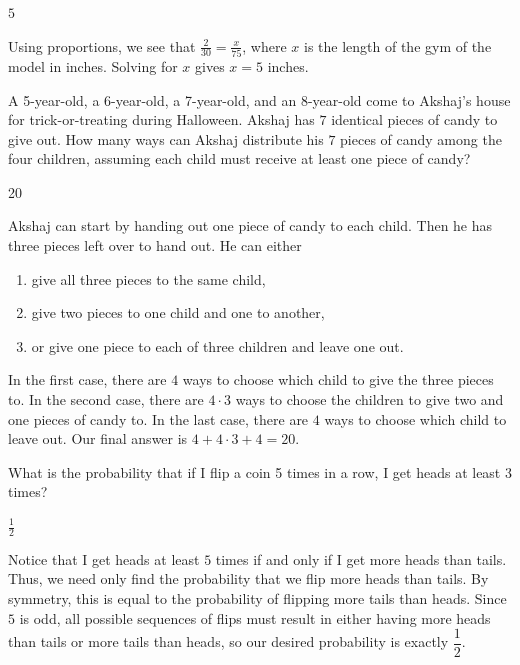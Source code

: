 \documentclass[11pt]{article}
\begin{document}
\begin{answer}
$5$
\end{answer}

\begin{solution}
Using proportions, we see that $\frac{2}{30} = \frac{x}{75}$, where $x$ is the length of the gym of the model in inches. Solving for $x$ gives $x=\boxed{5}$ inches.
\end{solution}


\begin{problem}
A 5-year-old, a 6-year-old, a 7-year-old, and an 8-year-old come to Akshaj's house for trick-or-treating during Halloween. Akshaj has $7$ identical pieces of candy to give out. How many ways can Akshaj distribute his $7$ pieces of candy among the four children, assuming each child must receive at least one piece of candy?
\end{problem}

\begin{answer}
20
\end{answer}

\begin{solution}
Akshaj can start by handing out one piece of candy to each child. Then he has three pieces left over to hand out. He can either \begin{enumerate} \item give all three pieces to the same child, \item give two pieces to one child and one to another, \item or give one piece to each of three children and leave one out. \end{enumerate}
In the first case, there are $4$ ways to choose which child to give the three pieces to. In the second case, there are $4 \cdot 3$ ways to choose the children to give two and one pieces of candy to. In the last case, there are $4$ ways to choose which child to leave out. Our final answer is $4 + 4 \cdot 3 + 4 = \boxed{20}$.
\end{solution}


\begin{problem}
What is the probability that if I flip a coin 5 times in a row, I get heads at least 3 times?
\end{problem}

\begin{answer}
$\frac{1}{2}$
\end{answer}

\begin{solution}
Notice that I get heads at least $5$ times if and only if I get more heads than tails. 
Thus, we need only find the probability that we flip more heads than tails. By symmetry, this is equal to the probability of flipping more 
tails than heads. Since $5$ is odd, all possible sequences of flips must result in either having more heads than tails or more 
tails than heads, so our desired probability is exactly $\boxed{\dfrac{1}{2}}$.
\end{solution}
\end{document}
